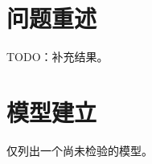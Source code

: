 \documentclass{ctexart}
\begin{document}
\section{问题重述}
TODO：补充结果。
\section{模型建立}
仅列出一个尚未检验的模型。
\end{document}
